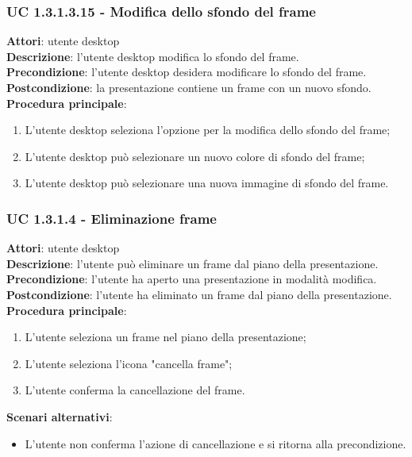 \subsubsection{UC 1.3.1.3.15 - Modifica dello sfondo del frame}{
	\label{uc1.3.1.3.15}
	\textbf{Attori}: utente desktop \\
	\textbf{Descrizione}: l'utente desktop modifica lo sfondo del frame. \\
	\textbf{Precondizione}: l'utente desktop desidera modificare lo sfondo del frame.	\\
	\textbf{Postcondizione}: la presentazione contiene un frame con un nuovo sfondo.	\\
	\textbf{Procedura principale}:
	\begin{enumerate}
		\item L'utente desktop seleziona l'opzione per la modifica dello sfondo del frame;
		\item L'utente desktop può selezionare un nuovo colore di sfondo del frame;
		\item L'utente desktop può selezionare una nuova immagine di sfondo del frame.
	\end{enumerate}
	}
\subsubsection{UC 1.3.1.4 - Eliminazione frame}{
	\label{uc1.3.1.4}
	\textbf{Attori}: utente desktop \\
	\textbf{Descrizione}: l'utente può eliminare un frame dal piano della presentazione. \\
	\textbf{Precondizione}: l'utente ha aperto una presentazione in modalità modifica.	\\
	\textbf{Postcondizione}: l'utente ha eliminato un frame dal piano della presentazione.	\\
	\textbf{Procedura principale}:
	\begin{enumerate}
		\item L'utente seleziona un frame nel piano della presentazione;
		\item L'utente seleziona l'icona "cancella frame";
		\item L'utente conferma la cancellazione del frame.
	\end{enumerate}
	\textbf{Scenari alternativi}: 
	\begin{itemize}
		\item L'utente non conferma l'azione di cancellazione e si ritorna alla precondizione.
	\end{itemize}
}

